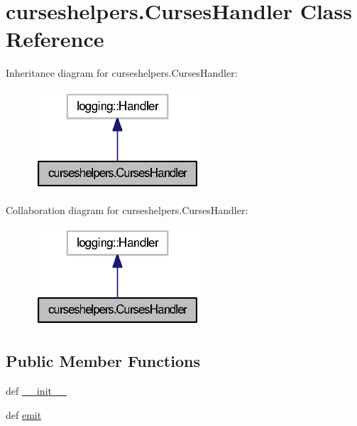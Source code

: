 \section{curseshelpers.\-Curses\-Handler Class Reference}
\label{classcurseshelpers_1_1CursesHandler}


Inheritance diagram for curseshelpers.\-Curses\-Handler\-:
\nopagebreak
\begin{figure}[H]
\begin{center}
\leavevmode
\includegraphics[width=176pt]{classcurseshelpers_1_1CursesHandler__inherit__graph}
\end{center}
\end{figure}


Collaboration diagram for curseshelpers.\-Curses\-Handler\-:
\nopagebreak
\begin{figure}[H]
\begin{center}
\leavevmode
\includegraphics[width=176pt]{classcurseshelpers_1_1CursesHandler__coll__graph}
\end{center}
\end{figure}
\subsection*{Public Member Functions}
\begin{DoxyCompactItemize}
\item 
def \hyperlink{classcurseshelpers_1_1CursesHandler_a62cfec39658d2ebdc7bd7652ac2070d0}{\-\_\-\-\_\-init\-\_\-\-\_\-}
\item 
def \hyperlink{classcurseshelpers_1_1CursesHandler_affcbe662b5a991cf44da2ce930456edc}{emit}
\end{DoxyCompactItemize}
